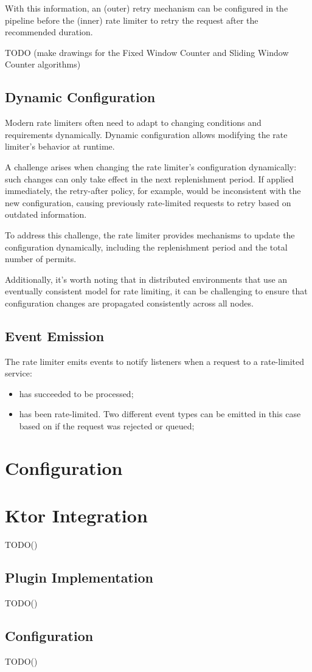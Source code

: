 With this information,
an (outer) retry mechanism can be configured in the pipeline before the
(inner) rate limiter to retry the request after the recommended duration.

TODO (make drawings for the Fixed Window Counter and Sliding Window Counter algorithms)

\subsection{Dynamic Configuration}\label{subsec:rate-limiter-dynamic-configuration}

Modern rate limiters often need to adapt to changing conditions and requirements dynamically.
Dynamic configuration allows modifying the rate limiter's behavior at runtime.

A challenge arises when changing the rate limiter's configuration dynamically: such changes can only take effect in
the next replenishment period.
If applied immediately, the retry-after policy, for example, would be inconsistent with the new configuration,
causing previously rate-limited requests to retry based on outdated information.

To address this challenge, the rate limiter provides mechanisms to update the configuration dynamically, including the
replenishment period and the total number of permits.

Additionally, it's worth noting that in distributed environments that use an eventually consistent model for rate limiting,
it can be challenging to ensure that configuration changes are propagated consistently across all nodes.

\subsection{Event Emission}\label{subsec:rate-limiter-event-emission}

The rate limiter emits events to notify listeners when a request to a rate-limited service:

\begin{itemize}
    \item has succeeded to be processed;
    \item has been rate-limited.
    Two different event types can be emitted in this case based on if the request was rejected or queued;
\end{itemize}


\section{Configuration}\label{sec:rate-limiter-configuration}


\section{Ktor Integration}\label{sec:rate-limiter-ktor-integration}

TODO()

\subsection{Plugin Implementation}\label{subsec:rate-limiter-plugin}

TODO()

\subsection{Configuration}\label{subsec:rate-limiter-configuration}

TODO()
